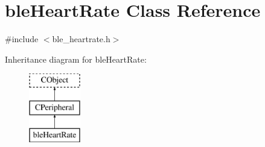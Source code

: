 \hypertarget{classble_heart_rate}{\section{ble\-Heart\-Rate Class Reference}
\label{classble_heart_rate}
}


{\ttfamily \#include $<$ble\-\_\-heartrate.\-h$>$}

Inheritance diagram for ble\-Heart\-Rate\-:\begin{figure}[H]
\begin{center}
\leavevmode
\includegraphics[height=3.000000cm]{d3/d81/classble_heart_rate}
\end{center}
\end{figure}
